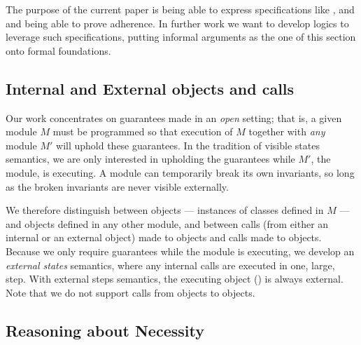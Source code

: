  The purpose of the current paper is being able to express specifications like \SrobustB, and
and being able to prove adherence. In further work we want to develop logics to leverage such specifications, putting
informal arguments as the  one of this section onto formal foundations.
 

 
\subsection{Internal and External objects and calls}
\label{s:concepts}

Our work concentrates on guarantees made in an \emph{open} setting; that is, a given module
$M$ must be programmed so that %
execution of $M$ together with \emph{any} \externalM 
module $M'$ will uphold these guarantees. In the tradition of
visible states semantics, we are  only interested in upholding the guarantees while 
$M'$, the  \emph{\externalM} module, is executing. A module can
temporarily break its own invariants,
so long as the broken invariants are never visible externally.
   
We therefore distinguish between \emph{\internalO}
objects --- instances of classes defined in $M$ ---
and \emph{\externalO} objects defined in any other module, and
between \emph{\internalC} calls  (from either an internal or an external object)  made %
 to \internalO objects and \emph{\externalC} calls made %
 to \externalC objects. %
%
%
Because we only require guarantees while 
the  \externalM module  is executing,
we develop an \emph{external states} semantics, where
 any internal calls are executed in one, large, step.
With external steps semantics,  the executing object () is always   external. 
Note that we do not support calls from
\internalO objects to \externalO objects.
 

\newcommand{\vertsp} {\vspace{.05in}} 
 
\subsection{Reasoning about Necessity}
\label{s:approach}

